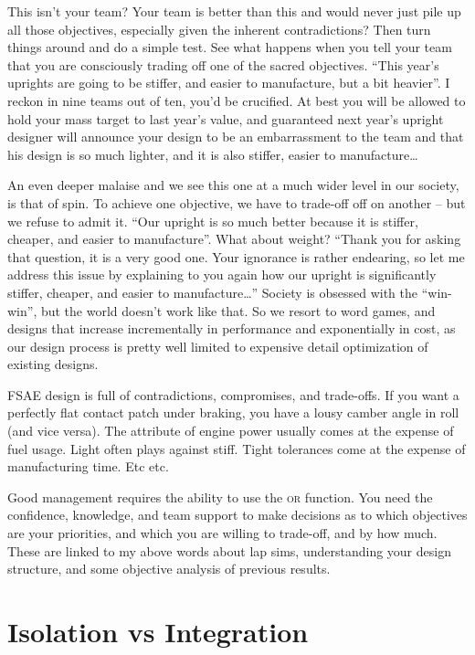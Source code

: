 \documentclass[10pt, a4paper, article, oneside, twocolumn, final]{memoir}
\begin{document}
This isn’t your team? Your team is better than this and would never just pile up all those objectives, especially given the inherent contradictions? Then turn things around and do a simple test. See what happens when you tell your team that you are consciously trading off one of the sacred objectives. “This year’s uprights are going to be stiffer, and easier to manufacture, but a bit heavier”. I reckon in nine teams out of ten, you’d be crucified. At best you will be allowed to hold your mass target to last year’s value, and guaranteed next year’s upright designer will announce your design to be an embarrassment to the team and that his design is so much lighter, and it is also stiffer, easier to manufacture\ldots

An even deeper malaise and we see this one at a much wider level in our society, is that of spin. To achieve one objective, we have to trade-off off on another -- but we refuse to admit it. “Our upright is so much better because it is stiffer, cheaper, and easier to manufacture”. What about weight? “Thank you for asking that question, it is a very good one. Your ignorance is rather endearing, so let me address this issue by explaining to you again how our upright is significantly stiffer, cheaper, and easier to manufacture\ldots” Society is obsessed with the “win-win”, but the world doesn’t work like that. So we resort to word games, and designs that increase incrementally in performance and exponentially in cost, as our design process is pretty well limited to expensive detail optimization of existing designs. 

FSAE design is full of contradictions, compromises, and trade-offs. If you want a perfectly flat contact patch under braking, you have a lousy camber angle in roll (and vice versa). The attribute of engine power usually comes at the expense of fuel usage. Light often plays against stiff. Tight tolerances come at the expense of manufacturing time. Etc etc. 

Good management requires the ability to use the \textsc{or} function. You need the confidence, knowledge, and team support to make decisions as to which objectives are your priorities, and which you are willing to trade-off, and by how much. These are linked to my above words about lap sims, understanding your design structure, and some objective analysis of previous results. 



\chapter*{Isolation vs Integration}
\end{document}
